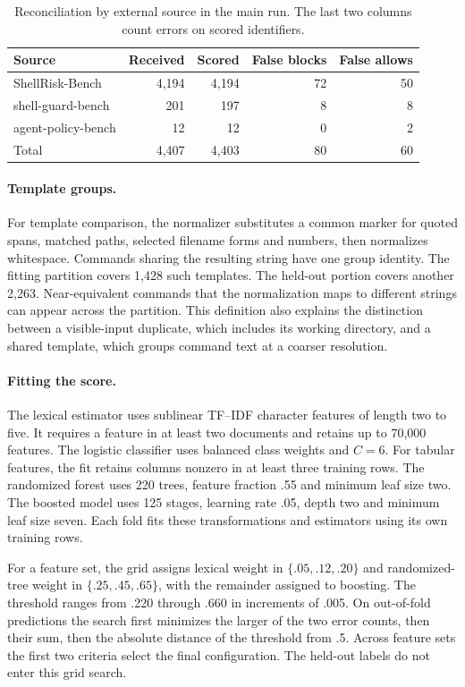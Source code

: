 \begin{table}[tb]
\centering\small
\caption{Reconciliation by external source in the main run. The last two columns count errors on scored identifiers.}
\label{tab:sources}
\begin{tabular}{@{}lrrrr@{}}\toprule
Source & Received & Scored & False blocks & False allows\\\midrule
ShellRisk-Bench & 4,194 & 4,194 & 72 & 50\\
shell-guard-bench & 201 & 197 & 8 & 8\\
agent-policy-bench & 12 & 12 & 0 & 2\\\midrule
Total & 4,407 & 4,403 & 80 & 60\\\bottomrule
\end{tabular}
\end{table}

\paragraph{Template groups.}
For template comparison, the normalizer substitutes a common marker for quoted spans, matched paths, selected filename forms and numbers, then normalizes whitespace. Commands sharing the resulting string have one group identity. The fitting partition covers 1,428 such templates. The held-out portion covers another 2,263. Near-equivalent commands that the normalization maps to different strings can appear across the partition. This definition also explains the distinction between a visible-input duplicate, which includes its working directory, and a shared template, which groups command text at a coarser resolution.

\paragraph{Fitting the score.}
The lexical estimator uses sublinear TF--IDF character features of length two to five. It requires a feature in at least two documents and retains up to 70,000 features. The logistic classifier uses balanced class weights and $C=6$. For tabular features, the fit retains columns nonzero in at least three training rows. The randomized forest uses 220 trees, feature fraction .55 and minimum leaf size two. The boosted model uses 125 stages, learning rate .05, depth two and minimum leaf size seven. Each fold fits these transformations and estimators using its own training rows.

For a feature set, the grid assigns lexical weight in $\{.05,.12,.20\}$ and randomized-tree weight in $\{.25,.45,.65\}$, with the remainder assigned to boosting. The threshold ranges from .220 through .660 in increments of .005. On out-of-fold predictions the search first minimizes the larger of the two error counts, then their sum, then the absolute distance of the threshold from .5. Across feature sets the first two criteria select the final configuration. The held-out labels do not enter this grid search.

